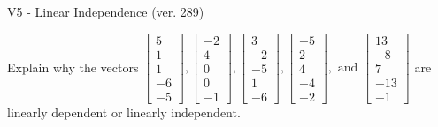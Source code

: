\begin{exercise}
  \begin{exerciseTitle}V5 - Linear Independence (ver. 289)\end{exerciseTitle}
  \begin{exerciseStatement}
    Explain why the vectors \(\left[\begin{array}{r}
5 \\
1 \\
1 \\
-6 \\
-5
\end{array}\right] , \left[\begin{array}{r}
-2 \\
4 \\
0 \\
0 \\
-1
\end{array}\right] , \left[\begin{array}{r}
3 \\
-2 \\
-5 \\
1 \\
-6
\end{array}\right] , \left[\begin{array}{r}
-5 \\
2 \\
4 \\
-4 \\
-2
\end{array}\right] , \text{ and } \left[\begin{array}{r}
13 \\
-8 \\
7 \\
-13 \\
-1
\end{array}\right]\) are linearly dependent or linearly independent.	



\end{exerciseStatement}
\end{exercise}
